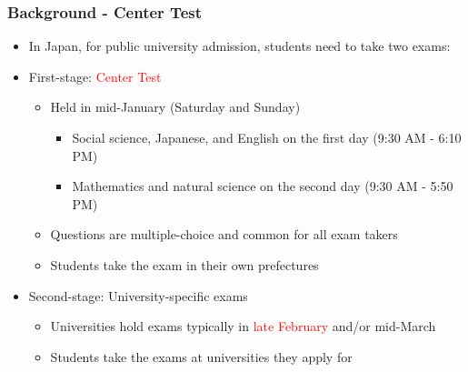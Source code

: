 \documentclass[10pt, pdfmx,hiresbb]{beamer}
\begin{document}
\begin{frame}\frametitle{Background - Center Test}
  \begin{itemize}
    \item In Japan, for public university admission, students need to take two exams:
    \item First-stage: \textcolor{red}{Center Test}
      \begin{itemize}
        \item Held in mid-January (Saturday and Sunday)
          \begin{itemize}
            \item Social science, Japanese, and English on the first day (9:30 AM - 6:10 PM)
            \item Mathematics and natural science on the second day (9:30 AM - 5:50 PM)
          \end{itemize}
        \item Questions are multiple-choice and common for all exam takers
        \item Students take the exam in their own prefectures
      \end{itemize}
    \item Second-stage: University-specific exams
      \begin{itemize}
        \item Universities hold exams typically in \textcolor{red}{late February} and/or mid-March
        \item Students take the exams at universities they apply for
      \end{itemize}
  \end{itemize}
\end{frame}
\end{document}

